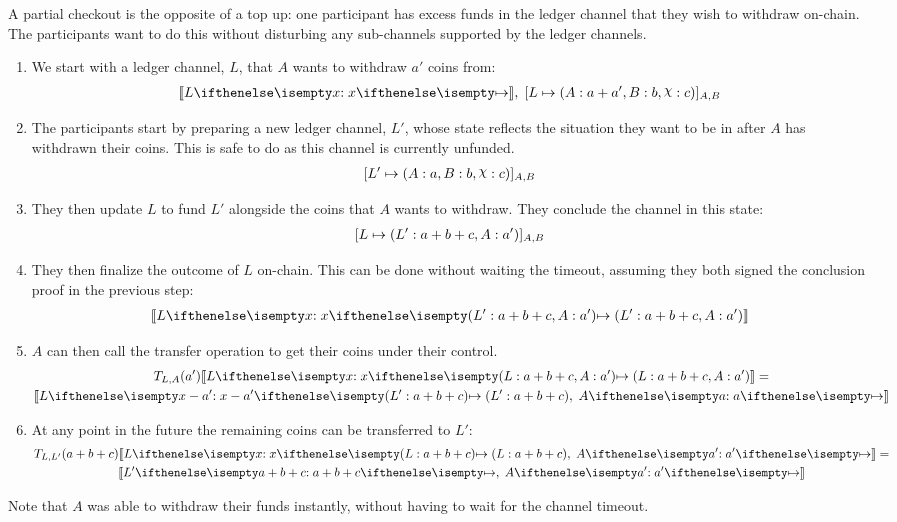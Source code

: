 A partial checkout is the opposite of a top up: 
one participant has excess funds in the ledger channel that they wish to withdraw on-chain.
The participants want to do this without disturbing any sub-channels supported by the ledger channels.
\begin{enumerate}
  \item We start with a ledger channel, $L$, that $A$ wants to withdraw $a'$ coins from:
  \begin{align}
    \adj{\holds{L}{x}{}}, \; \finalizable{L}{\alloc{A: a + a', B: b, \rchi: c}}{A, B}
  \end{align}
  \item The participants start by preparing a new ledger channel, $L'$, whose state reflects the situation they want to be in after $A$ has withdrawn their coins. This is safe to do as this channel is currently unfunded.
  \begin{align}
    \finalizable{L'}{\alloc{A: a, B:b, \rchi: c}}{A,B}
  \end{align}
  \item They then update $L$ to fund $L'$ alongside the coins that $A$ wants to withdraw. They conclude the channel in this state:
  \begin{align}
    [L \mapsto ( L': a + b + c, A: a' )]_{A,B}
  \end{align}
  \item They then finalize the outcome of $L$ on-chain. This can be done without waiting the timeout, assuming they both signed the conclusion proof in the previous step:
  \begin{align}
    \adj{\holds{L}{x}{\alloc{L': a + b + c, A: a'}}}
  \end{align}
  \item $A$ can then call the transfer operation to get their coins under their control. 
  \begin{multline}
    \transfer{L}{A}{a'}\adj{\holds{L}{x}{\alloc{L: a + b + c, A: a'}}} = \\ \adj{\holds{L}{x - a'}{\alloc{L': a + b + c}}, \; \holds{A}{a}{}}
  \end{multline}
  \item At any point in the future the remaining coins can be transferred to $L'$:
  \begin{multline}
    \transfer{L}{L'}{a + b + c}\adj{\holds{L}{x}{\alloc{L: a + b + c}}, \; \holds{A}{a'}{}} =  \\ \adj{\holds{L'}{a + b + c}{}, \; \holds{A}{a'}{}}
  \end{multline}
\end{enumerate}
Note that $A$ was able to withdraw their funds instantly, without having to wait for the channel timeout.
